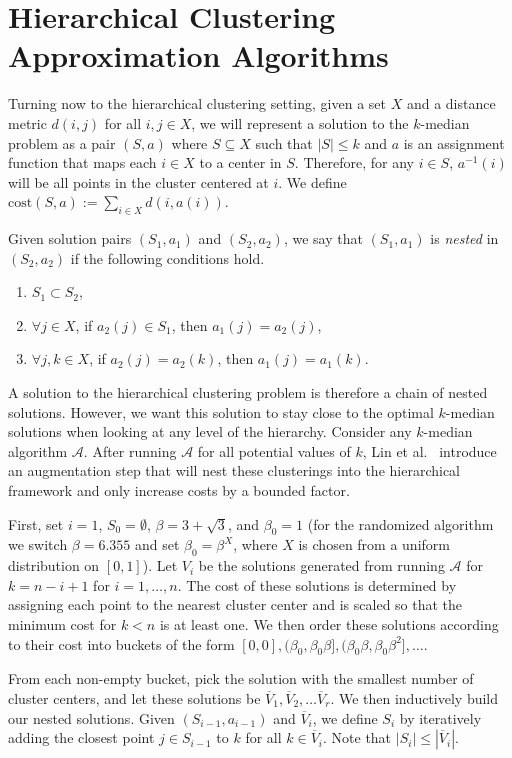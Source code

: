 \documentclass{article}
\begin{document}
\section{Hierarchical Clustering Approximation Algorithms}
Turning now to the hierarchical clustering setting, given a set $X$ and a distance metric $d(i,j)$ for all $i,j \in X$, we will represent a solution to the $k$-median problem as a pair $(S, a)$ where $S \subseteq X$ such that $|S| \leq k$ and $a$ is an assignment function that maps each $i \in X$ to a center in $S$. Therefore, for any $i \in S$, $a^{-1}(i)$ will be all points in the cluster centered at $i$. We define $\mathrm{cost}(S,a) := \sum_{i \in X} d(i, a(i))$.

Given solution pairs $(S_1, a_1)$ and $(S_2, a_2)$, we say that $(S_1, a_1)$ is \emph{nested} in $(S_2, a_2)$ if the following conditions hold.
\begin{enumerate}
	\item $S_1 \subset S_2$, 
	\item $\forall  j \in X$, if $a_2(j) \in S_1$, then $a_1(j) = a_2(j)$, 
	\item $\forall j, k \in X$, if $a_2(j) = a_2(k)$, then $a_1(j) = a_1(k)$.
\end{enumerate}
 A solution to the hierarchical clustering problem is therefore a chain of nested solutions. However, we want this solution to stay close to the optimal $k$-median solutions when looking at any level of the hierarchy.  
Consider any $k$-median algorithm $\mathcal{A}$. After running $\mathcal{A}$ for all potential values of $k$, Lin et al.~\cite{Lin} introduce an augmentation step that will nest these clusterings into the hierarchical framework and only increase costs by a bounded factor. 

First, set $i=1$, $S_0 = \emptyset$, $\beta = 3+\sqrt{3}$, and $\beta_0 = 1$ (for the randomized algorithm we switch $\beta = 6.355$ and set $\beta_0 = \beta^X$, where $X$ is chosen from a uniform distribution on $[0,1]$). Let $V_i$ be the solutions generated from running $\mathcal{A}$ for $k=n-i+1$ for $i=1, \ldots, n$. The cost of these solutions is determined by assigning each point to the nearest cluster center and is scaled so that the minimum cost for $k<n$ is at least one. We then order these solutions according to their cost into buckets of the form $[0,0], (\beta_0, \beta_0 \beta], (\beta_0 \beta, \beta_0 \beta^2], \ldots $. 

From each non-empty bucket, pick the solution with the smallest number of cluster centers, and let these solutions be $\overline{V}_1, \overline{V}_2, \ldots \overline{V}_r$. We then inductively build our nested solutions. Given $(S_{i-1}, a_{i-1})$ and $\overline{V}_i$, we define $S_i$ by iteratively adding the closest point $j \in S_{i-1}$ to $k$ for all $k \in \overline{V}_i$. Note that $|S_{i}| \leq |\overline{V}_i|$. 
\end{document}
